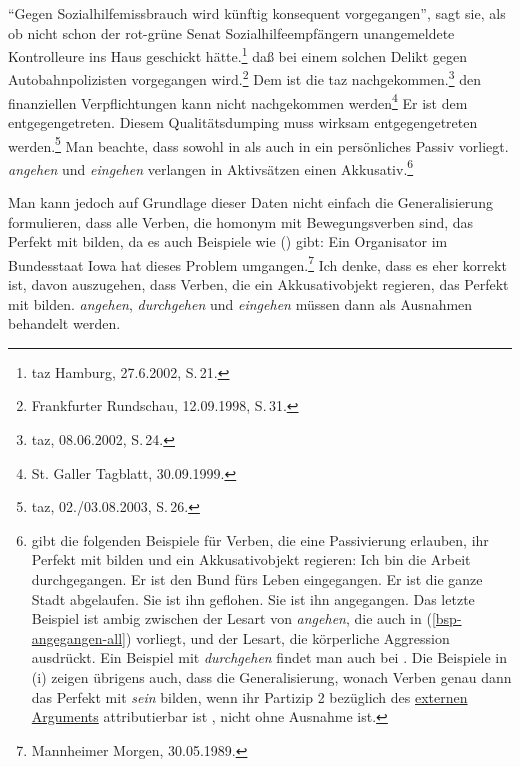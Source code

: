 \ex{}
"`Gegen Sozialhilfemissbrauch wird künftig konsequent vorgegangen"', sagt sie, als ob nicht schon der rot-grüne Senat 
     Sozialhilfeempfängern unangemeldete Kontrolleure ins Haus geschickt hätte.\footnote{
         taz Hamburg, 27.6.2002, S.\,21.%
    }%
%
\ex 
daß bei einem solchen Delikt gegen Autobahnpolizisten vorgegangen wird.\footnote{
        Frankfurter Rundschau, 12.09.1998, S.\,31.%
}
\zl
\eal
\label{ex-nachgekommen-werden}
\ex{}
Dem ist die taz nachgekommen.\footnote{
        taz, 08.06.2002, S.\,24.%
    }
\ex 
den finanziellen Verpflichtungen kann nicht nachgekommen werden\footnote{
        St. Galler Tagblatt, 30.09.1999.%
        }
\zl
\eal{}
\ex Er ist dem entgegengetreten.
\ex Diesem Qualitätsdumping muss wirksam entgegengetreten werden.\footnote{
        taz, 02./03.08.2003, S.\,26.
}
\zl
Man beachte, dass sowohl in  als auch in  ein persönliches
Passiv vorliegt. \emph{angehen} und \emph{eingehen} verlangen in Aktivsätzen einen Akkusativ.\footnote{
\citet[]{Grewendorf89a} gibt die folgenden Beispiele für Verben, die eine Passivierung erlauben,
ihr Perfekt mit \sein bilden und ein Akkusativobjekt regieren:
\eal
\ex{}
Ich bin die Arbeit durchgegangen.
\ex 
Er ist den Bund fürs Leben eingegangen.
\ex{}
Er ist die ganze Stadt abgelaufen.
\ex{}
Sie ist ihn geflohen.
\ex{}
Sie ist ihn angegangen.
\zl
Das letzte Beispiel ist ambig zwischen der Lesart von \emph{angehen},
die auch in (\ref{bsp-angegangen-all}) vorliegt, und der Lesart, die
körperliche Aggression ausdrückt.
Ein Beispiel mit \emph{durchgehen} findet man auch bei \citet[]{Toman86a}.
Die Beispiele in (i) zeigen übrigens auch, dass die Generalisierung, wonach
Verben genau dann das Perfekt mit \emph{sein} bilden, wenn ihr Partizip 2 bezüglich des 
\hyperlink{externesArgument}{externen Arguments} %
attributierbar ist \citep[]{Gunkel2003b}, nicht ohne Ausnahme ist.%
}

Man kann jedoch auf Grundlage dieser Daten nicht einfach die Generalisierung formulieren,
dass alle Verben, die homonym mit Bewegungsverben sind, das Perfekt mit
\sein bilden, da es auch Beispiele wie () gibt:
\ea
Ein Organisator im Bundesstaat Iowa hat dieses Problem umgangen.\footnote{
 Mannheimer Morgen, 30.05.1989.%
}
\z
Ich denke, dass es eher korrekt ist, davon auszugehen, dass Verben, die
ein Akkusativobjekt regieren, das Perfekt mit \haben bilden. 
\emph{angehen}, \emph{durchgehen} und \emph{eingehen} müssen dann als
Ausnahmen behandelt werden.%
%

